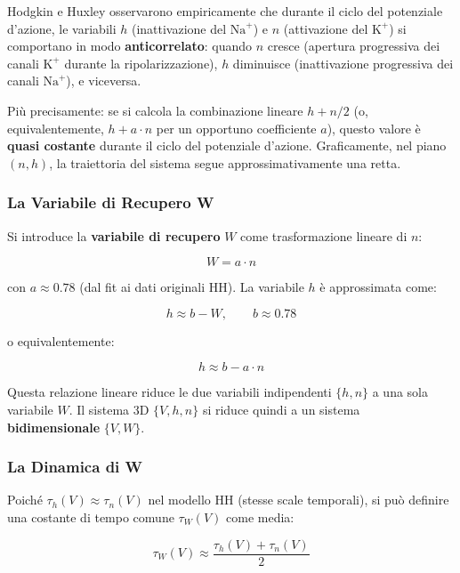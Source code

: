 Hodgkin e Huxley osservarono empiricamente che durante il ciclo del potenziale d'azione, le variabili $h$ (inattivazione del $\text{Na}^+$) e $n$ (attivazione del $\text{K}^+$) si comportano in modo \textbf{anticorrelato}: quando $n$ cresce (apertura progressiva dei canali $\text{K}^+$ durante la ripolarizzazione), $h$ diminuisce (inattivazione progressiva dei canali $\text{Na}^+$), e viceversa.

Più precisamente: se si calcola la combinazione lineare $h + n/2$ (o, equivalentemente, $h + a \cdot n$ per un opportuno coefficiente $a$), questo valore è \textbf{quasi costante} durante il ciclo del potenziale d'azione. Graficamente, nel piano $(n, h)$, la traiettoria del sistema segue approssimativamente una retta.

\subsubsection{La Variabile di Recupero W}

Si introduce la \textbf{variabile di recupero} $W$ come trasformazione lineare di $n$:

\begin{equation}
W = a \cdot n
\end{equation}

con $a \approx 0.78$ (dal fit ai dati originali HH). La variabile $h$ è approssimata come:

\begin{equation}
h \approx b - W, \qquad b \approx 0.78
\end{equation}

o equivalentemente:

\begin{equation}
h \approx b - a \cdot n
\end{equation}

Questa relazione lineare riduce le due variabili indipendenti $\{h, n\}$ a una sola variabile $W$. Il sistema 3D $\{V, h, n\}$ si riduce quindi a un sistema \textbf{bidimensionale} $\{V, W\}$.

\subsubsection{La Dinamica di W}

Poiché $\tau_h(V) \approx \tau_n(V)$ nel modello HH (stesse scale temporali), si può definire una costante di tempo comune $\tau_W(V)$ come media:

\begin{equation}
\tau_W(V) \approx \frac{\tau_h(V) + \tau_n(V)}{2}
\end{equation}

